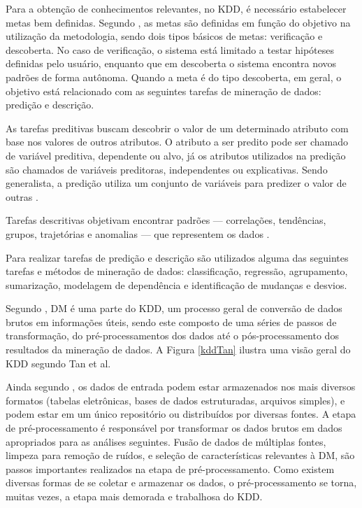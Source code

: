 Para a obtenção de conhecimentos relevantes, no KDD, é necessário estabelecer
metas bem definidas. Segundo , as metas são definidas
em função do objetivo na utilização da metodologia, sendo dois tipos básicos de
metas: verificação e descoberta. No caso de verificação, o sistema está limitado
a testar hipóteses definidas pelo usuário, enquanto que em descoberta o sistema
encontra novos padrões de forma autônoma. Quando a meta é do tipo descoberta, em
geral, o objetivo está relacionado com as seguintes tarefas de mineração de
dados: predição e descrição.

As tarefas preditivas buscam descobrir o valor de um determinado atributo com
base nos valores de outros atributos. O atributo a ser predito pode ser chamado
de variável preditiva, dependente ou alvo, já os atributos utilizados na
predição são chamados de variáveis preditoras, independentes ou explicativas.
Sendo generalista, a predição utiliza um conjunto de variáveis para predizer o
valor de outras \cite{fayyad1996data}.

Tarefas descritivas objetivam encontrar padrões --- correlações, tendências,
grupos, trajetórias e anomalias --- que representem os dados
\cite{fayyad1996data}.

Para realizar tarefas de predição e descrição são utilizados alguma das
seguintes tarefas e métodos de mineração de dados: classificação, regressão,
agrupamento, sumarização, modelagem de dependência e identificação de mudanças e
desvios.

Segundo , DM é uma parte do KDD, um processo
geral de conversão de dados brutos em informações úteis, sendo este composto de
uma séries de passos de transformação, do pré-processamentos dos dados até o
pós-processamento dos resultados da mineração de dados. A Figura \ref{kddTan}
ilustra uma visão geral do KDD segundo Tan et al.


Ainda segundo , os dados de entrada podem estar
armazenados nos mais diversos formatos (tabelas eletrônicas, bases de dados
estruturadas, arquivos simples), e podem estar em um único repositório ou
distribuídos por diversas fontes. A etapa de pré-processamento é responsável por
transformar os dados brutos em dados apropriados para as análises seguintes.
Fusão de dados de múltiplas fontes, limpeza para remoção de ruídos, e seleção de
características relevantes à DM, são passos importantes realizados na etapa de
pré-processamento. Como existem diversas formas de se coletar e armazenar os
dados, o pré-processamento se torna, muitas vezes, a etapa mais demorada e
trabalhosa do KDD.

